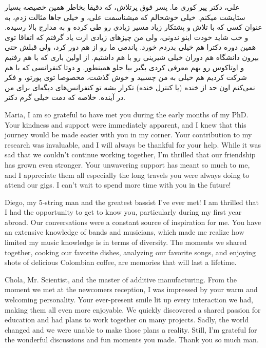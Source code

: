 \begin{flushright}
\foreignlanguage{persian}
{
علی، دکتر پیر کوری ما. پسر فوق پرتلاش، که دقیقا بخاطر همین خصیصه بسیار ستایشت میکنم. خیلی خوشحالم که میشناسمت علی، و خیلی جاها مثالت زدم، به عنوان کسی که با تلاش و پشتکار زیاد مسیر زیادی رو طی کرده و به مدارج بالا رسیده. و خب شاید خودت اینو ندونی، ولی من چیزهای زیادی ازت یاد گرفتم که اتفاقا توی همین دوره دکترا هم خیلی بدردم خورد. پاندمی ما رو از هم دور کرد، ولی قبلش حتی بیرون دانشگاه هم دوران خیلی شیرینی رو با هم داشتیم. از اولین باری که با هم رفتیم و اوتاکوس رو بهم معرفی کردی بگیر بیا جلو همینطور. و دوتا کنفرانسی که با هم شرکت کردیم هم خیلی به من چسبید و خوش گذشت، مخصوصا توی پورتو، و فکر نمی‌کنم اون حد از خنده (یا کنترل خنده) تکرار بشه تو کنفرانس‌های دیگه‌ای برای من در آینده. خلاصه که دمت خیلی گرم دکتر.
}
\end{flushright}

Maria, I am so grateful to have met you during the early months of my PhD. Your kindness and support were immediately apparent, and I knew that this journey would be made easier with you in my corner. Your contribution to my research was invaluable, and I will always be thankful for your help. While it was sad that we couldn't continue working together, I'm thrilled that our friendship has grown even stronger. Your unwavering support has meant so much to me, and I appreciate them all especially the long travels you were always doing to attend our gigs. I can't wait to spend more time with you in the future!

Diego, my 5-string man and the greatest bassist I've ever met! I am thrilled that I had the opportunity to get to know you, particularly during my first year abroad. Our conversations were a constant source of inspiration for me. You have an extensive knowledge of bands and musicians, which made me realize how limited my music knowledge is in terms of diversity. The moments we shared together, cooking our favorite dishes, analyzing our favorite songs, and enjoying shots of delicious Colombian coffee, are memories that will last a lifetime.

Chola, Mr. Scientist, and the master of additive manufacturing. From the moment we met at the newcomers reception, I was impressed by your warm and welcoming personality. Your ever-present smile lit up every interaction we had, making them all even more enjoyable. We quickly discovered a shared passion for education and had plans to work together on many projects. Sadly, the world changed and we were unable to make those plans a reality. Still, I'm grateful for the wonderful discussions and fun moments you made. Thank you so much man.

